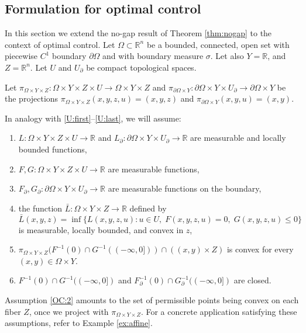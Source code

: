 \documentclass{article}
\newcommand{\R}{\mathbb{R}}
\theoremstyle{definition}
\theoremstyle{remark}
\newcommand{\proj}{\pi}
\newcommand{\projXYZ}{\proj_{\Omega\times Y\times Z}}
\newcommand{\projdXY}{\proj_{\partial\Omega\times Y}}
\begin{document}
\subsection{Formulation for optimal control}
\label{sec:oc}

In this section we extend the no-gap result of Theorem \ref{thm:nogap} to the context of optimal control. Let $\Omega\subset\R^n$ be a bounded, connected, open set with piecewise $C^1$ boundary $\partial\Omega$ and with boundary measure $\sigma$. Let also $Y=\R$, and $Z=\R^{n}$. Let $U$ and $U_\partial$ be compact topological spaces. 

Let $\projXYZ{}\colon \Omega\times Y\times Z\times U\to \Omega\times Y\times Z$ and $\projdXY{}\colon\partial\Omega\times Y\times U_\partial\to \partial\Omega\times Y$ 
be the projections 
$\projXYZ{}(x,y,z,u)=(x,y,z)$ and $\projdXY{}(x,y,u)=(x,y)$. 

In analogy with \ref{U:first}--\ref{U:last}, we will assume:
\begin{enumerate}[label=OC\arabic*.,ref=OC\arabic*]
    \item \label{OC:first} $L\colon \Omega\times Y\times Z\times U\to\R$ and $L_\partial \colon\partial\Omega\times Y\times U_\partial\to\R$ are measurable and locally bounded functions, %
    \item $F,G\colon \Omega\times Y\times Z\times U\to\R$ are measurable functions,
    \item $F_\partial,G_\partial\colon\partial \Omega\times Y\times U_\partial\to \R$ are measurable functions on the boundary,
     \item\label{OC:3} the function $\bar L\colon \Omega\times Y\times Z\to\R$ defined by
     \begin{equation}\label{eq:defLbar}
      \bar L(x,y,z)=\inf\{L(x,y,z,u):u\in U,\;F(x,y,z,u)=0,\; G(x,y,z,u)\leq 0\}
     \end{equation}
     is measurable, locally bounded, and convex in $z$,
     \item\label{OC:2} $\projXYZ{}(F^{-1}(0)\cap G^{-1}((-\infty,0]))\cap((x,y)\times Z)$ is convex for every $(x,y)\in\Omega\times Y$.
     \item \label{OC:last}  $F^{-1}(0)\cap G^{-1}((-\infty,0])$ and $F_\partial^{-1}(0)\cap G^{-1}_\partial((-\infty,0])$ are closed.
\end{enumerate}
Assumption \ref{OC:2} amounts to the set of permissible points being convex on each fiber $Z$, once we project with $\projXYZ{}$. For a concrete application satisfying these assumptions, refer to Example \ref{ex:affine}.
\end{document}
